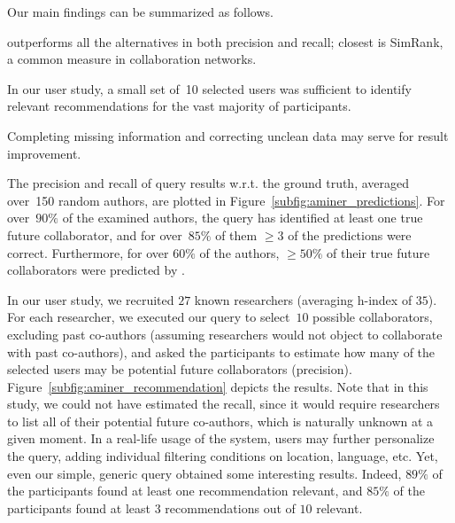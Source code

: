 Our main findings can be summarized as follows.
\begin{compactitem}
\item \qlang{} outperforms all the alternatives in both precision and recall; closest is SimRank, a common measure in collaboration networks.
\item In our user study, a small set of~10 selected users was sufficient to identify relevant recommendations for the vast majority of participants.
\item Completing missing information and correcting unclean data may serve for result improvement.
\end{compactitem}
The precision and recall of query results w.r.t. the ground truth,
averaged over~150 random authors, are plotted in
Figure~\ref{subfig:aminer_predictions}.
For over~$90\%$ of the examined authors, the \qlang{} query has identified at least one true future collaborator, and for over~$85\%$ of them $\geq 3$ of the predictions were correct.
Furthermore, for over $60\%$ of the authors, $\geq 50\%$ of
their true future collaborators were predicted by \qlang{}.


In our user study, we recruited $27$ known researchers (averaging h-index of $35$). For each researcher, we executed our \qlang{} query to select~$10$ possible collaborators, excluding past co-authors (assuming researchers would not object to collaborate with past co-authors), and asked the participants to estimate
how many of the selected users may be potential future collaborators
(precision). Figure~\ref{subfig:aminer_recommendation} depicts the results. Note that in this study, we could not have estimated the recall, since it would require researchers to list all of their potential future co-authors, which is naturally
unknown at a given moment. In a real-life usage of the system, users may further personalize
the query, adding individual filtering conditions on
location, language, etc. Yet, even our simple, generic query obtained
some interesting results. Indeed, $89\%$ of the participants found
at least one recommendation relevant, 
and $85\%$ of the participants found at least $3$ recommendations
out of $10$ relevant.

